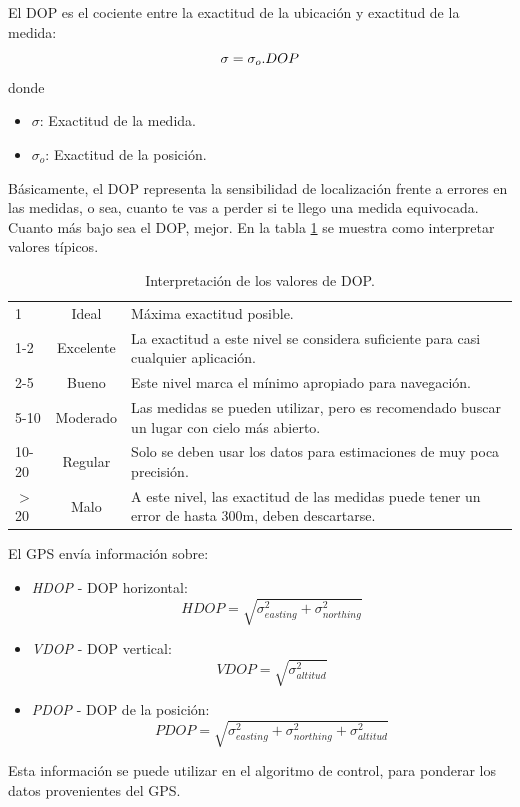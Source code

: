 \documentclass[main]{subfiles}
\begin{document}
El DOP es el cociente entre la exactitud de la ubicación y exactitud de la medida\cite{bib:sat-pos}:
\begin{equation*}
  \sigma = \sigma_o.DOP
\vspace{-10pt}
\end{equation*}
donde
\begin{itemize}
\item $\sigma$: Exactitud de la medida.
\item $\sigma_o$: Exactitud de la posición. 
\end{itemize}

 Básicamente, el DOP representa la sensibilidad de localización frente a errores en las medidas, o sea, cuanto te vas a perder si te llego una medida equivocada. Cuanto más bajo sea el DOP, mejor. En la tabla \ref{tab:dop} se muestra como interpretar valores típicos\cite{bib:sat-dop-values}.

\begin{table}[H]
\begin{center}
\begin{tabular}{|l|c||p{7cm}|}
\hline
\rowcolor[gray]{0.9}
1 & Ideal & Máxima exactitud posible.\\
\rowcolor[gray]{0.95}
1-2 & Excelente & La exactitud a este nivel se considera suficiente para casi cualquier aplicación.\\
\rowcolor[gray]{0.9}
2-5 & Bueno & Este nivel marca el mínimo apropiado para navegación. \\
\rowcolor[gray]{0.95}
5-10 & Moderado & Las medidas se pueden utilizar, pero es recomendado buscar un lugar con cielo más abierto. \\
\rowcolor[gray]{0.9}
10-20 & Regular & Solo se deben usar los datos para estimaciones de muy poca precisión. \\
\rowcolor[gray]{0.95}
$>$20 & Malo & A este nivel, las exactitud de las medidas puede tener un error de hasta 300m, deben descartarse. \\
\hline
\end{tabular}
\caption{Interpretación de los valores de DOP.}
\label{tab:dop}
\end{center}
\end{table}

El GPS envía información sobre:
\begin{itemize}
\item \textit{HDOP} - DOP horizontal:
  \begin{equation}
    \label{eq:hdop}
    HDOP = \sqrt{\sigma_{easting}^2+\sigma_{northing}^2}    
  \end{equation}
\item \textit{VDOP} - DOP vertical:
  \begin{equation}
    \label{eq:vdop}
    VDOP = \sqrt{\sigma_{altitud}^2}
  \end{equation}
\item \textit{PDOP} - DOP de la posición:
  \begin{equation}
    \label{eq:pdop}
    PDOP = \sqrt{\sigma_{easting}^2+\sigma_{northing}^2 + \sigma_{altitud}^2}
  \end{equation}
\end{itemize}

Esta información se puede utilizar en el algoritmo de control, para ponderar los datos provenientes del GPS.
\end{document}
